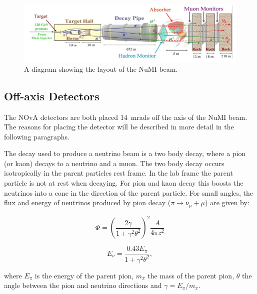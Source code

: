 \begin{figure}
  \centering
  \includegraphics[width=1\textwidth]{../../img/beam/beam_diagram.png}
  \caption{A diagram showing the layout of the NuMI beam.}
  \label{fig:NuMI}
\end{figure}


\subsection{Off-axis Detectors}

The NOvA detectors are both placed 14~mrads off the axis of the NuMI
beam.
The reasons for placing the detector will be described
in more detail in the following paragraphs. 

The decay used to produce a neutrino beam is a two body decay, where a
pion (or kaon) decays to a neutrino and a muon. The two body decay 
occurs isotropically in the parent particles rest frame. 
In the lab frame the parent particle is not at rest when decaying. For
pion and kaon decay this boosts the neutrinos into a cone in the
direction of the parent particle.
For small angles, the flux and energy of neutrinos produced by pion
decay ($\pi \rightarrow \nu_{\mu} + \mu$) are given by:

\begin{equation}
\Phi = \left( \dfrac{2\gamma}{1+\gamma^2 \theta^2} \right)^2 \dfrac{A}{4\pi z^2}
\label{eqn:NuPiFlux}
\end{equation}

\begin{equation}
E_{\nu} = \dfrac{0.43E_{\pi}}{1+\gamma^2\theta^2},
\label{eqn:NuPiEnrgy}
\end{equation}

where $E_{\pi}$ is the energy of the parent pion, $m_{\pi}$ the mass of the
parent pion, $\theta$ the angle between the pion and neutrino
directions and $\gamma = E_{\pi}/m_{\pi}$.

